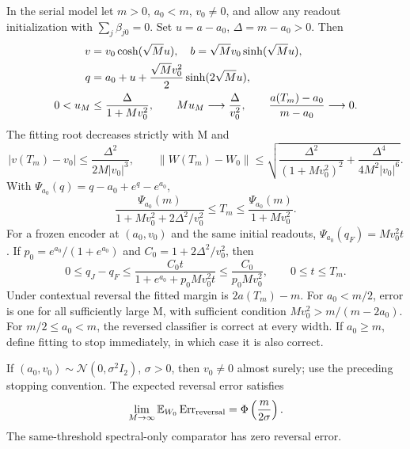 \begin{corollary}
\label{cor:astra_isotropic}
In the serial model let $m>0$, $a_0<m$, $v_0\ne0$, and allow any
readout initialization with $\sum_j\beta_{j0}=0$. Set
$u=a-a_0$, $\Delta=m-a_0>0$. Then
\begin{align}
 v&=v_0\cosh(\sqrt M u),\quad b=\sqrt Mv_0\sinh(\sqrt M u),
 \label{eq:astra_iso_phase}\\
 q&=a_0+u+\frac{\sqrt Mv_0^2}{2}\sinh(2\sqrt M u),\notag\\
 0<u_M&\le\frac{\Delta}{1+Mv_0^2},\qquad
 Mu_M\longrightarrow\frac{\Delta}{v_0^2},\qquad
 \frac{a(T_m)-a_0}{m-a_0}\longrightarrow0.
 \label{eq:astra_iso_update}
\end{align}
The fitting root decreases strictly with M and
\begin{equation}\label{eq:astra_iso_disp}
 |v(T_m)-v_0|\le\frac{\Delta^2}{2M|v_0|^3},\qquad
 \|W(T_m)-W_0\|\le
 \sqrt{\frac{\Delta^2}{(1+Mv_0^2)^2}+
       \frac{\Delta^4}{4M^2|v_0|^6}}.
\end{equation}
With $\Psi_{a_0}(q)=q-a_0+e^q-e^{a_0}$,
\[
 \frac{\Psi_{a_0}(m)}{1+Mv_0^2+2\Delta^2/v_0^2}
 \le T_m\le\frac{\Psi_{a_0}(m)}{1+Mv_0^2}.
\]
For a frozen encoder at $(a_0,v_0)$ and the same initial readouts,
$\Psi_{a_0}(q_F)=Mv_0^2t$. If
$p_0=e^{a_0}/(1+e^{a_0})$ and $C_0=1+2\Delta^2/v_0^2$, then
\begin{equation}\label{eq:astra_iso_gap}
 0\le q_J-q_F\le\frac{C_0t}{1+e^{a_0}+p_0Mv_0^2t}
 \le\frac{C_0}{p_0Mv_0^2},\qquad0\le t\le T_m.
\end{equation}
Under contextual reversal the fitted margin is $2a(T_m)-m$.
For $a_0<m/2$, error is one for all sufficiently large M, with sufficient
condition $Mv_0^2>m/(m-2a_0)$. For $m/2\le a_0<m$, the reversed
classifier is correct at every width. If $a_0\ge m$, define fitting to
stop immediately, in which case it is also correct.

If $(a_0,v_0)\sim\mathcal N(0,\sigma^2 I_2)$, $\sigma>0$, then
$v_0\ne0$ almost surely; use the preceding stopping convention.
The expected reversal error satisfies
\begin{equation}\label{eq:astra_iso_error}
 \lim_{M\to\infty}\mathbb{E}_{W_0}\operatorname{Err}_{\rm reversal}
 =\Phi\left(\frac{m}{2\sigma}\right).
\end{equation}
The same-threshold spectral-only comparator has zero reversal error.
\end{corollary}
